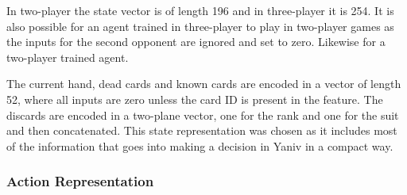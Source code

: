 \documentclass[../main.tex]{subfiles}
\begin{document}
\begin{table}[]
\caption{The Yaniv State Encoding.}
\label{tab:state-enc}
\end{table}

In two-player the state vector is of length 196 and in three-player it is 254. It is also possible for an agent trained in three-player to play in two-player games as the inputs for the second opponent are ignored and set to zero. Likewise for a two-player trained agent. 

The current hand, dead cards and known cards are encoded in a vector of length 52, where all inputs are zero unless the card ID is present in the feature. The discards are encoded in a two-plane vector, one for the rank and one for the suit and then concatenated. This state representation was chosen as it includes most of the information that goes into making a decision in Yaniv in a compact way. 

\subsubsection{Action Representation}
\end{document}

